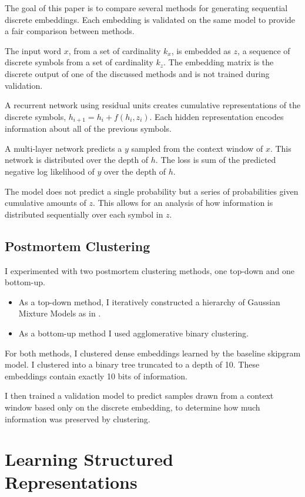 \documentclass[sigconf]{acmart}
\begin{document}
The goal of this paper is to compare several methods for generating sequential discrete embeddings. Each embedding is validated on the same model to provide a fair comparison between methods.

The input word $x$, from a set of cardinality $k_x$, is embedded as $z$, a sequence of discrete symbols from a set of cardinality $k_z$. The embedding matrix is the discrete output of one of the discussed methods and is not trained during validation.

A recurrent network using residual units creates cumulative representations of the discrete symbols, $h_{i+1} = h_i + f(h_i, z_i)$. Each hidden representation encodes information about all of the previous symbols.

A multi-layer network predicts a $y$ sampled from the context window of $x$. This network is distributed over the depth of $h$. The loss is sum of the predicted negative log likelihood of $y$ over the depth of $h$.

The model does not predict a single probability but a series of probabilities given cumulative amounts of $z$. This allows for an analysis of how information is distributed sequentially over each symbol in $z$.

\subsection{Postmortem Clustering}

I experimented with two postmortem clustering methods, one top-down and one bottom-up.

\begin{itemize}
\item As a top-down method, I iteratively constructed a hierarchy of Gaussian Mixture Models as in \cite{Mnih:2008:SHD:2981780.2981915}. 
\item As a bottom-up method I used agglomerative binary clustering.
\end{itemize}

For both methods, I clustered dense embeddings learned by the baseline skipgram model. I clustered into a binary tree truncated to a depth of 10. These embeddings contain exactly 10 bits of information.

I then trained a validation model to predict samples drawn from a context window based only on the discrete embedding, to determine how much information was preserved by clustering.

\section{Learning Structured Representations}
\end{document}
